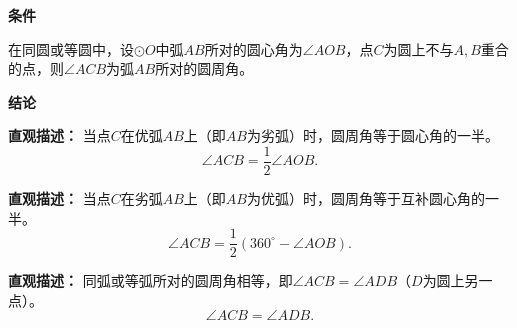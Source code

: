 \begin{statementbox}
	\textbf{\textcolor{CStatement}{条件}}
	\begin{description}[style=nextline, leftmargin=2.8em, labelsep=0.5em, itemsep=0.35em]
		\item[\textbf{\textcolor{CStatement}{条件 1（同圆等弧）：}}]
			在同圆或等圆中，设$\odot O$中弧$AB$所对的圆心角为$\angle AOB$，点$C$为圆上不与$A,B$重合的点，则$\angle ACB$为弧$AB$所对的圆周角。
	\end{description}
	\textbf{\textcolor{CStatement}{结论}}
	\begin{description}[style=nextline, leftmargin=2.8em, labelsep=0.5em, itemsep=0.45em]
		\item[\textbf{\textcolor{CStatement}{结论一（劣弧圆周角）：}}]
			\textbf{\textcolor{CStatement}{直观描述：}}
			当点$C$在优弧$AB$上（即$AB$为劣弧）时，圆周角等于圆心角的一半。
			\[
				\angle ACB = \frac{1}{2}\angle AOB.
			\]
		\item[\textbf{\textcolor{CStatement}{结论二（优弧圆周角）：}}]
			\textbf{\textcolor{CStatement}{直观描述：}}
			当点$C$在劣弧$AB$上（即$AB$为优弧）时，圆周角等于互补圆心角的一半。
			\[
				\angle ACB = \frac{1}{2}(360^\circ - \angle AOB).
			\]
		\item[\textbf{\textcolor{CStatement}{推广结论（等弧对等角）：}}]
			\textbf{\textcolor{CStatement}{直观描述：}}
			同弧或等弧所对的圆周角相等，即$\angle ACB = \angle ADB$（$D$为圆上另一点）。
			\[
				\angle ACB = \angle ADB.
			\]
	\end{description}

\end{statementbox}
